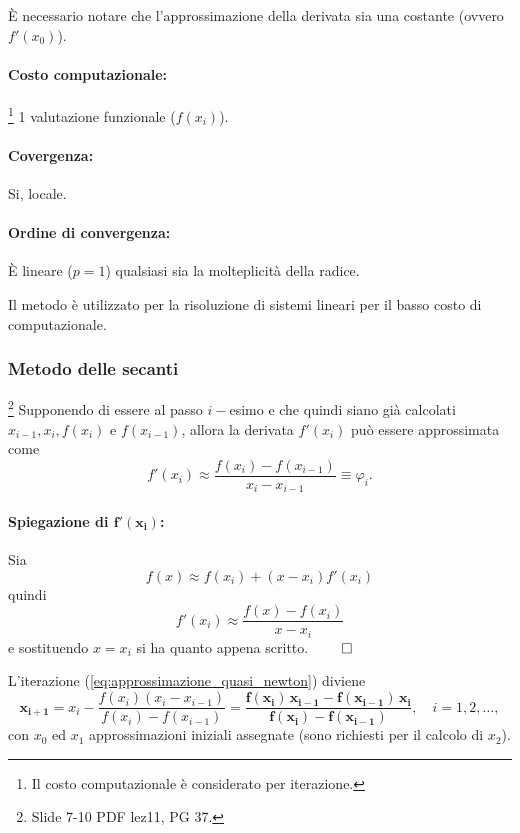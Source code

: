 \noindent È necessario notare che l'approssimazione della derivata sia una costante (ovvero $f'(x_0)$).

\paragraph{Costo computazionale:}\footnote{Il costo computazionale è considerato per iterazione.} 1 valutazione funzionale ($f(x_i)$).
\paragraph{Covergenza:}Si, locale.
\paragraph{Ordine di convergenza:} È lineare ($p = 1$) qualsiasi sia la molteplicità della radice.

\noindent Il metodo è utilizzato per la risoluzione di sistemi lineari per il basso costo di computazionale.

\subsubsection{Metodo delle secanti}\label{sssec:metodo_secanti}
\footnote{Slide 7-10 PDF lez11, PG  37.}
Supponendo di essere al passo $i-$esimo e che quindi siano già calcolati $x_{i-1},x_i, f(x_i)$ e $f(x_{i-1})$, allora la derivata $f'(x_i)$ può essere approssimata come 
\begin{equation*}
 	 f'(x_i)\approx\frac{f(x_i)-f(x_{i-1})}{x_i-x_{i-1}}\equiv\varphi_i.
\end{equation*}

\paragraph{Spiegazione di $\boldsymbol{f'(x_i)}$:} Sia
\begin{equation*}
	f(x)\approx f(x_i)+(x-x_i)f'(x_i)
\end{equation*}
quindi 
\begin{equation*}
	 f'(x_i)\approx\frac{f(x)-f(x_{i})}{x-x_i}
\end{equation*}
e sostituendo $x=x_i$ si ha quanto appena scritto. $\qed$

\noindent L'iterazione (\ref{eq:approssimazione_quasi_newton}) diviene
\begin{equation}\label{eq:approxSecanti}
	\boldsymbol{x_{i+1}}=x_i-\frac{f(x_i)(x_i-x_{i-1})}{f(x_i)-f(x_{i-1})}=\boldsymbol{\frac{f(x_i)\,x_{i-1} - f(x_{i-1})\,x_i}{f(x_i)-f(x_{i-1})}}, \quad i=1,2,\hdots,
\end{equation}
con $x_0$ ed $x_1$ approssimazioni iniziali assegnate (sono richiesti per il calcolo di $x_2$).

